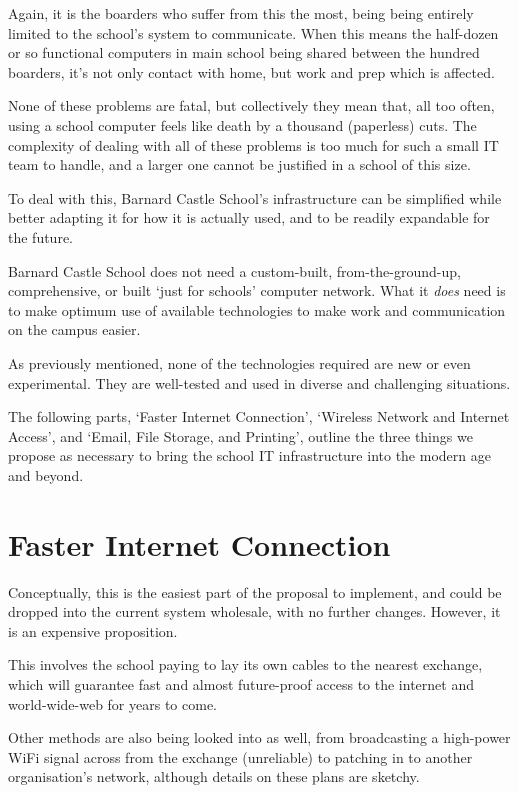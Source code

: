 \documentclass[a4paper,leqno,titlepage]{article}
\begin{document}
Again, it is the boarders who suffer from this the most, being being entirely
limited to the school's system to communicate. When this means the
half-dozen or so functional computers in main school being shared between the
hundred boarders, it's not only contact with home,
but work and prep which is affected.


None of these problems are fatal, but collectively they mean that, all too often,
using a school computer feels like death by a thousand (paperless) cuts.
The complexity of dealing with all of these problems is too much for such a
small IT team to handle, and a larger one cannot be justified in a school of
this size.


To deal with this, Barnard Castle School's infrastructure can be simplified
while better adapting it for how it is actually used, and to be
readily expandable for the future.


Barnard Castle School does not need a custom-built, from-the-ground-up,
comprehensive, or built `just for schools' computer network.
What it \emph{does} need is to make optimum use of available technologies
to make work and communication on the campus easier.


As previously mentioned, none of the technologies required are new or even
experimental. They are well-tested and used in diverse and challenging
situations.

The following parts,
`Faster Internet Connection',
`Wireless Network and Internet Access',
and `Email, File Storage, and Printing',
outline the three things we propose as necessary to bring the school IT
infrastructure into the modern age and beyond.






\section{Faster Internet Connection}


Conceptually, this is the easiest part of the proposal to implement,
and could be dropped into the current system wholesale, with no further changes.
However, it is an expensive proposition.


This involves the school paying to lay its own cables to the nearest exchange,
which will guarantee fast and almost future-proof access to the internet and
world-wide-web for years to come.


Other methods are also being looked into as well, from broadcasting a high-power
WiFi signal across from the exchange (unreliable) to patching in to another
organisation's network, although details on these plans are sketchy.
\end{document}
